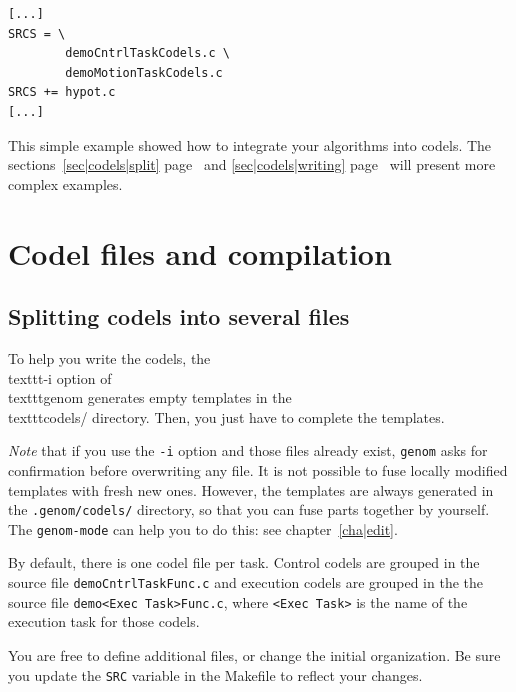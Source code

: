 \begin{center}\begin{cartouche}\small\begin{verbatim}
[...]
SRCS = \
        demoCntrlTaskCodels.c \
        demoMotionTaskCodels.c
SRCS += hypot.c
[...]
\end{verbatim}\end{cartouche}\end{center}

This simple example showed how to integrate  your algorithms into codels.
The sections~\ref{sec|codels|split} page~\pageref{sec|codels|split} and
\ref{sec|codels|writing} page~\pageref{sec|codels|writing} will present
more complex examples.


\section{Codel files and compilation}

\subsection{Splitting codels into several files}

To help you   write the  codels, the \\texttt{-i}  option of  \\texttt{genom}
generates empty templates in the \\texttt{codels/} directory. Then, you just
have to complete the templates.

\emph{Note}  that if you use the  \texttt{-i} option  and those files already
exist, \texttt{genom} asks for confirmation before  overwriting any file. It
is not possible to  fuse locally modified  templates with fresh new ones.
However, the   templates are always generated  in  the  \texttt{.genom/codels/}
directory, so  that  you can fuse   parts together by  yourself. The 
\texttt{genom-mode} can help you to do this: see chapter~\ref{cha|edit}.

By default, there is one codel file per task.  Control codels are grouped
in the  source file  \texttt{demoCntrlTaskFunc.c}  and execution  codels are
grouped  in the the source  file \texttt{demo<Exec  Task>Func.c}, where 
\texttt{<Exec Task>} is the name of the execution task for those codels.

You are    free  to define   additional  files,  or  change  the  initial
organization.  Be sure you update the  \texttt{SRC} variable in the Makefile
to reflect your changes.


